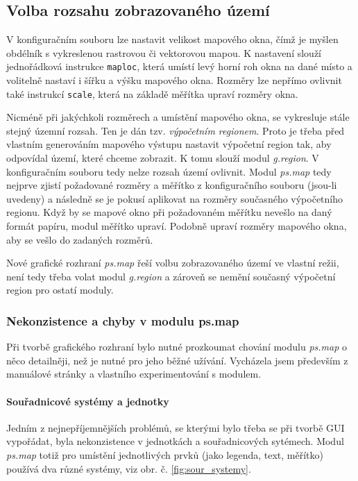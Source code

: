 \documentclass[a4paper,12pt,draft]{article}
\newcommand{\modul}[1]{\emph{#1}}
\begin{document}
\subsection{Volba rozsahu zobrazovaného území}
V konfiguračním souboru lze nastavit velikost mapového okna, čímž je myšlen obdélník s vykreslenou rastrovou či vektorovou mapou.  K nastavení slouží jednořádková instrukce \lstinline[style=psmap]{maploc}, která umístí levý horní roh okna na dané místo a volitelně nastaví i šířku a výšku mapového okna. Rozměry lze nepřímo ovlivnit také instrukcí \lstinline[style=psmap]{scale}, která na základě měřítka upraví rozměry okna. 

Nicméně při jakýchkoli rozměrech a umístění mapového okna, se vykresluje stále stejný územní rozsah. Ten je dán tzv. \emph{výpočetním regionem}. Proto je třeba před vlastním generováním mapového výstupu nastavit výpočetní region tak, aby odpovídal území, které chceme zobrazit. K tomu slouží modul \modul{g.region}. V konfiguračním souboru tedy nelze rozsah území ovlivnit.
Modul \modul{ps.map} tedy nejprve zjistí požadované rozměry a měřítko z konfiguračního souboru (jsou-li uvedeny) a následně se je pokusí aplikovat na rozměry současného výpočetního regionu. Když by se mapové okno při požadovaném měřítku nevešlo na daný formát papíru, modul měřítko upraví. Podobně upraví rozměry mapového okna, aby se vešlo do zadaných rozměrů.

Nové grafické rozhraní \modul{ps.map} řeší volbu zobrazovaného území ve vlastní režii, není tedy třeba volat modul \modul{g.region} a zároveň se nemění současný výpočetní region pro ostatí moduly. %

\subsubsection{Nekonzistence a chyby v modulu ps.map}
Při tvorbě grafického rozhraní bylo nutné prozkoumat chování modulu \modul{ps.map} o něco detailněji, než je nutné pro jeho běžné užívání. Vycházela jsem především z manuálové stránky \cite{manual} a vlastního experimentování s modulem. 

\paragraph*{Souřadnicové systémy a jednotky}
Jedním z nejnepříjemnějších problémů, se kterými bylo třeba se při tvorbě GUI vypořádat, byla nekonzistence v jednotkách a souřadnicových sytémech. Modul \modul{ps.map} totiž pro umístění jednotlivých prvků (jako legenda, text, měřítko) používá dva různé systémy, viz obr. č. \ref{fig:sour_systemy}.
\end{document}
